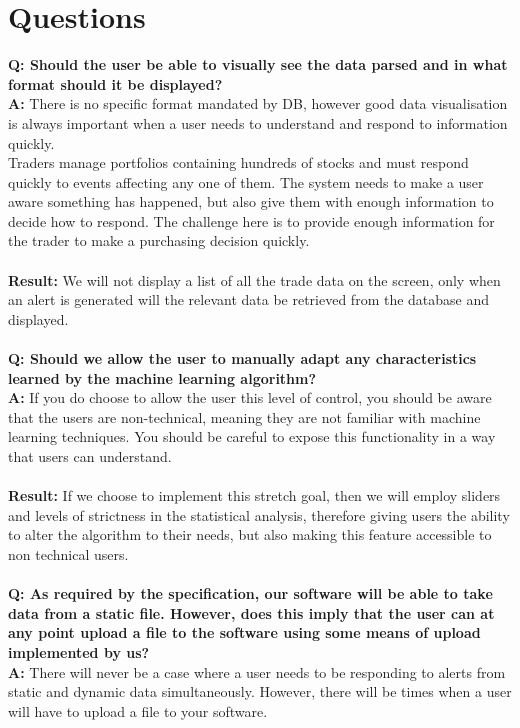 \documentclass[11pt, oneside, a4paper]{article}
\begin{document}
\section{Questions}
\textbf{Q: Should the user be able to visually see the data parsed and in what format should it be displayed?}\\
\textbf{A:} There is no specific format mandated by DB, however good data visualisation is always important when a user needs to
understand and respond to information quickly.\\
Traders manage portfolios containing hundreds of stocks and must respond quickly to events affecting any one of them. The system
needs to make a user aware something has happened, but also give them with enough information to decide how to respond. The
challenge here is to provide enough information for the trader to make a purchasing decision quickly. \\\\
\textbf{Result:} We will not display a list of all the trade data on the screen, only when an alert is generated will the
relevant data be retrieved from the database and displayed. \\\\
\textbf{Q: Should we allow the user to manually adapt any characteristics learned by the machine learning algorithm?}\\
\textbf{A:} If you do choose to allow the user this level of control, you should be aware that the users are non-technical, meaning
they are not familiar with machine learning techniques. You should be careful to expose this functionality in a way that users can understand. \\\\
\textbf{Result:} If we choose to implement this stretch goal, then we will employ sliders and levels of strictness in the statistical
analysis, therefore giving users the ability to alter the algorithm to their needs, but also making this feature accessible to non
technical users. \\\\
\textbf{Q: As required by the specification, our software will be able to take data from a static file. However, does this imply
that the user can at any point upload a file to the software using some means of upload implemented by us?}\\
\textbf{A:} There will never be a case where a user needs to be responding to alerts from static and dynamic data simultaneously.
However, there will be times when a user will have to upload a file to your software. \\\\
\end{document}
